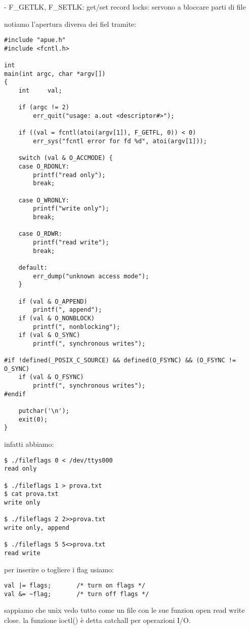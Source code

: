 - F\_GETLK, F\_SETLK: get/set record locks: servono a bloccare parti di file


notiamo l'apertura diversa dei fiel tramite:

\begin{lstlisting}
#include "apue.h"
#include <fcntl.h>

int
main(int argc, char *argv[])
{
	int		val;

	if (argc != 2)
		err_quit("usage: a.out <descriptor#>");

	if ((val = fcntl(atoi(argv[1]), F_GETFL, 0)) < 0)
		err_sys("fcntl error for fd %d", atoi(argv[1]));

	switch (val & O_ACCMODE) {
	case O_RDONLY:
		printf("read only");
		break;

	case O_WRONLY:
		printf("write only");
		break;

	case O_RDWR:
		printf("read write");
		break;

	default:
		err_dump("unknown access mode");
	}

	if (val & O_APPEND)
		printf(", append");
	if (val & O_NONBLOCK)
		printf(", nonblocking");
	if (val & O_SYNC)
		printf(", synchronous writes");

#if !defined(_POSIX_C_SOURCE) && defined(O_FSYNC) && (O_FSYNC != O_SYNC)
	if (val & O_FSYNC)
		printf(", synchronous writes");
#endif

	putchar('\n');
	exit(0);
}	
\end{lstlisting}

infatti abbiamo:

\begin{lstlisting}
$ ./fileflags 0 < /dev/ttys000
read only

$ ./fileflags 1 > prova.txt
$ cat prova.txt 
write only

$ ./fileflags 2 2>>prova.txt 
write only, append

$ ./fileflags 5 5<>prova.txt 
read write
\end{lstlisting}

per inserire o togliere i flag usiamo:

\begin{lstlisting}
val |= flags;		/* turn on flags */
val &= ~flag;		/* turn off flags */
\end{lstlisting}





sappiamo che unix vedo tutto come un file con le sue funzion open read write close. la funzione ioctl() è detta catchall per operazioni I/O.





